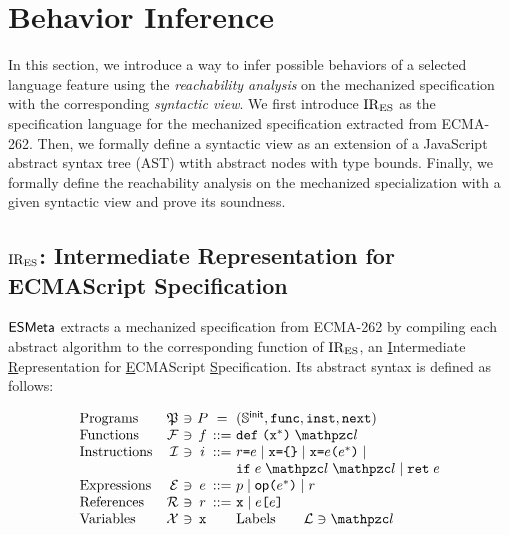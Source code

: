 \section{Behavior Inference}\label{sec:infer}

In this section, we introduce a way to infer possible behaviors of a selected
language feature using the \textit{reachability analysis} on the mechanized
specification with the corresponding \textit{syntactic view}.  We first
introduce $\text{IR}_\text{ES}$ as the specification language for the mechanized specification
extracted from ECMA-262.  Then, we formally define a syntactic view as an
extension of a JavaScript abstract syntax tree (AST) wtith abstract nodes with
type bounds.  Finally, we formally define the reachability analysis on the
mechanized specialization with a given syntactic view and prove its soundness.

\subsection{$\text{IR}_\text{ES}$: Intermediate Representation for ECMAScript Specification}

$\esmeta$ extracts a mechanized specification from ECMA-262 by compiling each
abstract algorithm to the corresponding function of $\text{IR}_\text{ES}$, an
\underline{I}ntermediate \underline{R}epresentation for \underline{E}CMAScript
\underline{S}pecification.  Its abstract syntax is defined as follows:

\[
  \begin{array}{lr@{~}c@{~}c@{~}c@{~}l}
    \text{Programs} & \progset &\ni& \prog &=& (\initstset,
    \getfunc, \getinst, \getnext)\\

    \text{Functions} & \funcset &\ni& \func &::=&
    \kwdef \; \kwrl \varx^* \kwrr \; \lab\\

    \text{Instructions} & \instset &\ni& \inst &::=&
    \refer \kweq \expr \mid
    \varx \kweq \kwcl \kwcr \mid
    \varx \kweq \expr \kwrl \expr^* \kwrr \mid \\&&&&&
    \kwif \; \expr \; \lab \; \lab \mid
    \kwret \; \expr\\

    \text{Expressions} & \exprset &\ni& \expr &::=&
    \pval \mid
    \op \kwrl \expr^* \kwrr \mid
    \refer\\

    \text{References} & \referset &\ni& \refer &::=&
    \varx \mid \expr \kwsl \expr \kwsr\\

    \text{Variables} & \varset &\ni& \varx &&

    \text{Labels} \qquad \labset \ni \lab\\
  \end{array}
\]

